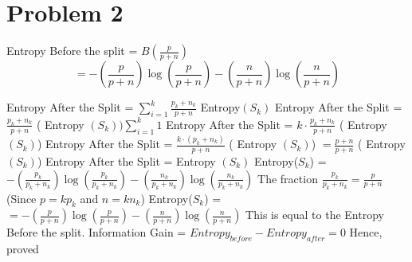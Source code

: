 \documentclass[11pt]{article}
\newcommand{\solution}[1]{{{\color{blue}{\bf Solution:} {#1}}}}
\begin{document}
\newpage
\section{Problem 2}

\solution{} \newline
Entropy Before the split = $B \left(\frac{p}{p+n} \right)$
$$
 = - \left(\frac{p}{p+n} \right) \log \left(\frac{p}{p+n}\right) - \left(\frac{n}{p+n} \right) \log \left(\frac{n}{p+n}\right)
$$


Entropy After the Split = $ \sum\limits_{i=1}^{k} \frac{p_{k} + n_{k}}{p + n}$ Entropy$(S_{k})$ \newline
Entropy After the Split = $\frac{p_{k} + n_{k}}{p + n}$ ( Entropy $(S_k) ) \sum\limits_{i=1}^{k} 1$ \newline
Entropy After the Split = $ k \cdot \frac{p_k + n_k}{p + n}$ ( Entropy $(S_k)$) \newline
Entropy After the Split = $ \frac{k \cdot (p_k + n_k)}{p + n}$ ( Entropy $(S_k)$) $ = \frac{p+n}{p+n}$ ( Entropy $(S_k)$) 
\bigbreak
Entropy After the Split = Entropy $(S_k)$
\bigbreak
Entropy($S_{k}$) = $ - \left( \frac{p_k}{p_k + n_k} \right) \log \left( \frac{p_k}{p_k + n_k} \right) - \left( \frac{n_k}{p_k + n_k} \right) \log \left( \frac{n_k}{p_k + n_k} \right)$
\bigbreak
The fraction $\frac{p_k}{p_k + n_k} = \frac{p}{p + n}$ (Since $p = kp_k$ and $n = kn_k$) \newline
Entropy($S_{k}$) = $
 = - \left(\frac{p}{p+n} \right) \log \left(\frac{p}{p+n}\right) - \left(\frac{n}{p+n} \right) \log \left(\frac{n}{p+n}\right) $ 
\bigbreak
This is equal to the Entropy Before the split. 
\bigbreak
Information Gain = $Entropy_{before} - Entropy_{after} = 0$ \newline
Hence, proved
\newpage
\end{document}
